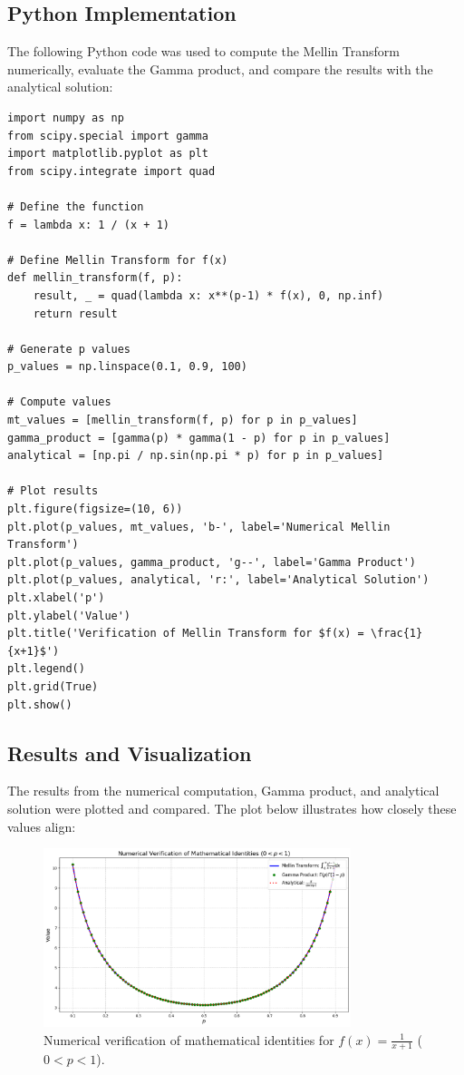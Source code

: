 \documentclass[a4paper, 12pt]{article}
\begin{document}
\subsection{Python Implementation}
The following Python code was used to compute the Mellin Transform numerically, evaluate the Gamma product, and compare the results with the analytical solution:
\begin{verbatim}
import numpy as np
from scipy.special import gamma
import matplotlib.pyplot as plt
from scipy.integrate import quad

# Define the function
f = lambda x: 1 / (x + 1)

# Define Mellin Transform for f(x)
def mellin_transform(f, p):
    result, _ = quad(lambda x: x**(p-1) * f(x), 0, np.inf)
    return result

# Generate p values
p_values = np.linspace(0.1, 0.9, 100)

# Compute values
mt_values = [mellin_transform(f, p) for p in p_values]
gamma_product = [gamma(p) * gamma(1 - p) for p in p_values]
analytical = [np.pi / np.sin(np.pi * p) for p in p_values]

# Plot results
plt.figure(figsize=(10, 6))
plt.plot(p_values, mt_values, 'b-', label='Numerical Mellin Transform')
plt.plot(p_values, gamma_product, 'g--', label='Gamma Product')
plt.plot(p_values, analytical, 'r:', label='Analytical Solution')
plt.xlabel('p')
plt.ylabel('Value')
plt.title('Verification of Mellin Transform for $f(x) = \frac{1}{x+1}$')
plt.legend()
plt.grid(True)
plt.show()
\end{verbatim}

\subsection{Results and Visualization}
The results from the numerical computation, Gamma product, and analytical solution were plotted and compared. The plot below illustrates how closely these values align:

\begin{figure}[H]
    \centering
    \includegraphics[width=0.8\textwidth]{Example.png}
    \caption{Numerical verification of mathematical identities for $f(x) = \frac{1}{x+1}$ ($0 < p < 1$).}
    \label{fig:mellin_identity}
\end{figure}
\end{document}
